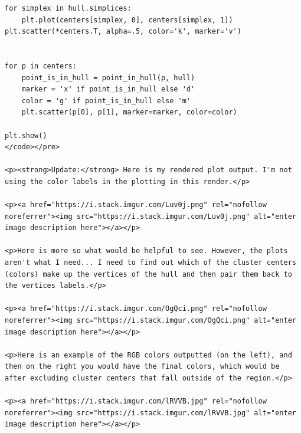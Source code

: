 \documentclass[a4paper,oneside]{book}
\begin{document}
\begin{lstlisting}
for simplex in hull.simplices:
    plt.plot(centers[simplex, 0], centers[simplex, 1])
plt.scatter(*centers.T, alpha=.5, color='k', marker='v')


for p in centers:
    point_is_in_hull = point_in_hull(p, hull)
    marker = 'x' if point_is_in_hull else 'd'
    color = 'g' if point_is_in_hull else 'm'
    plt.scatter(p[0], p[1], marker=marker, color=color)

plt.show()
</code></pre>

<p><strong>Update:</strong> Here is my rendered plot output. I'm not using the color labels in the plotting in this render.</p>

<p><a href="https://i.stack.imgur.com/Luv0j.png" rel="nofollow noreferrer"><img src="https://i.stack.imgur.com/Luv0j.png" alt="enter image description here"></a></p>

<p>Here is more so what would be helpful to see. However, the plots aren't what I need... I need to find out which of the cluster centers (colors) make up the vertices of the hull and then pair them back to the vertices labels.</p>

<p><a href="https://i.stack.imgur.com/OgQci.png" rel="nofollow noreferrer"><img src="https://i.stack.imgur.com/OgQci.png" alt="enter image description here"></a></p>

<p>Here is an example of the RGB colors outputted (on the left), and then on the right you would have the final colors, which would be after excluding cluster centers that fall outside of the region.</p>

<p><a href="https://i.stack.imgur.com/lRVVB.jpg" rel="nofollow noreferrer"><img src="https://i.stack.imgur.com/lRVVB.jpg" alt="enter image description here"></a></p>



\end{lstlisting}
\end{document}
